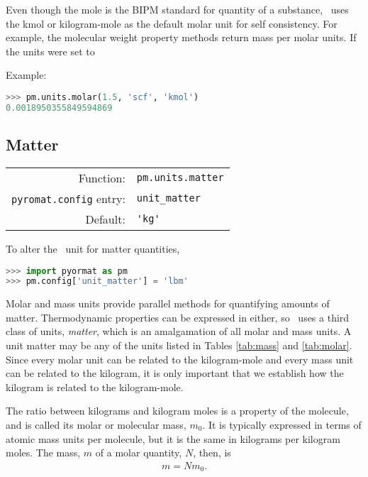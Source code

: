 Even though the mole is the BIPM standard for quantity of a substance, \PM\ uses the kmol or kilogram-mole as the default molar unit for self consistency.  For example, the molecular weight property methods return mass per molar units.  If the units were set to 


Example:
\begin{lstlisting}[language=Python]
>>> pm.units.molar(1.5, 'scf', 'kmol')
0.0018950355849594869
\end{lstlisting}


%
%

\subsection{Matter}\label{sec:units:matter}

\begin{tabular}{rl}
\hline
Function: & \verb|pm.units.matter|\\
\verb|pyromat.config| entry: & \verb|unit_matter|\\
Default: & \verb|'kg'|\\
\hline
\end{tabular}
\vspace{1em}

To alter the \PM\ unit for matter quantities,
\begin{lstlisting}[language=Python]
>>> import pyormat as pm
>>> pm.config['unit_matter'] = 'lbm'
\end{lstlisting}

Molar and mass units provide parallel methods for quantifying amounts of matter.  Thermodynamic properties can be expressed in either, so \PM\ uses a third class of units, \emph{matter}, which is an amalgamation of all molar and mass units.  A unit matter may be any of the units listed in Tables \ref{tab:mass} and \ref{tab:molar}.  Since every molar unit can be related to the kilogram-mole and every mass unit can be related to the kilogram, it is only important that we establish how the kilogram is related to the kilogram-mole.

The ratio between kilograms and kilogram moles is a property of the molecule, and is called its molar or molecular mass, $m_0$.  It is typically expressed in terms of atomic mass units per molecule, but it is the same in kilograms per kilogram moles.  The mass, $m$ of a molar quantity, $N$, then, is
\begin{align}
m = N m_0.
\end{align}

